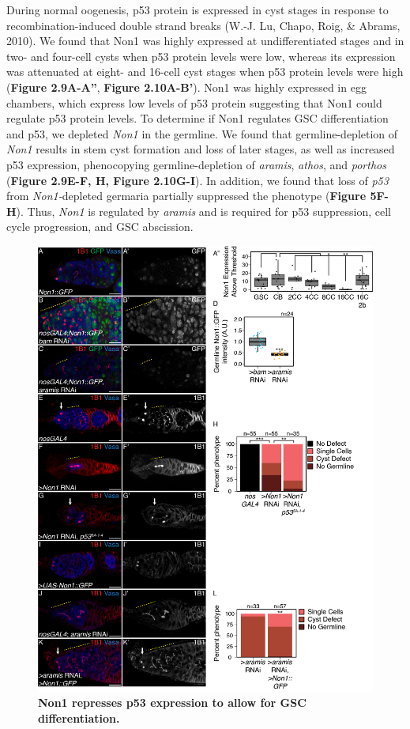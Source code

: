 \documentclass[12pt,oneside]{reedthesis}
\begin{document}
During normal oogenesis, p53 protein is expressed in cyst stages in response to recombination-induced double strand breaks (W.-J. Lu, Chapo, Roig, \& Abrams, 2010). We found that Non1 was highly expressed at undifferentiated stages and in two- and four-cell cysts when p53 protein levels were low, whereas its expression was attenuated at eight- and 16-cell cyst stages when p53 protein levels were high (\textbf{Figure 2.9A-A''}, \textbf{Figure 2.10A-B'}). Non1 was highly expressed in egg chambers, which express low levels of p53 protein suggesting that Non1 could regulate p53 protein levels. To determine if Non1 regulates GSC differentiation and p53, we depleted \emph{Non1} in the germline. We found that germline-depletion of \emph{Non1} results in stem cyst formation and loss of later stages, as well as increased p53 expression, phenocopying germline-depletion of \emph{aramis}, \emph{athos}, and \emph{porthos} (\textbf{Figure 2.9E-F, H, Figure 2.10G-I}). In addition, we found that loss of \emph{p53} from \emph{Non1-}depleted germaria partially suppressed the phenotype (\textbf{Figure 5F-H}). Thus, \emph{Non1} is regulated by \emph{aramis} and is required for p53 suppression, cell cycle progression, and GSC abscission.
\begin{figure}

{\centering \includegraphics[width=1\linewidth]{./figure/Ribosome Biogenesis/Ribosome Biogenesis 5} 

}

\caption[\textbf{Non1 represses p53 expression to allow for GSC differentiation.}]{\textbf{Non1 represses p53 expression to allow for GSC differentiation.}}\label{fig:unnamed-chunk-16}
\end{figure}
\end{document}
